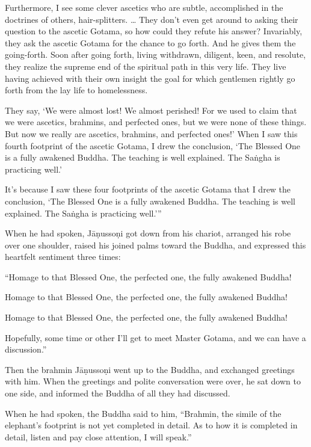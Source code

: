 \documentclass[12pt,openany]{book}%
\begin{document}
Furthermore, I see some clever ascetics who are subtle, accomplished in the doctrines of others, hair-splitters. … They don’t even get around to asking their question to the ascetic Gotama, so how could they refute his answer? Invariably, they ask the ascetic Gotama for the chance to go forth. And he gives them the going-forth. Soon after going forth, living withdrawn, diligent, keen, and resolute, they realize the supreme end of the spiritual path in this very life. They live having achieved with their own insight the goal for which gentlemen rightly go forth from the lay life to homelessness. 

They say, ‘We were almost lost! We almost perished! For we used to claim that we were ascetics, brahmins, and perfected ones, but we were none of these things. But now we really are ascetics, brahmins, and perfected ones!’ When I saw this fourth footprint of the ascetic Gotama, I drew the conclusion, ‘The Blessed One is a fully awakened Buddha. The teaching is well explained. The \textsanskrit{Saṅgha} is practicing well.’ 

It’s because I saw these four footprints of the ascetic Gotama that I drew the conclusion, ‘The Blessed One is a fully awakened Buddha. The teaching is well explained. The \textsanskrit{Saṅgha} is practicing well.’” 

When he had spoken, \textsanskrit{Jāṇussoṇi} got down from his chariot, arranged his robe over one shoulder, raised his joined palms toward the Buddha, and expressed this heartfelt sentiment three times: 

“Homage to that Blessed One, the perfected one, the fully awakened Buddha! 

Homage to that Blessed One, the perfected one, the fully awakened Buddha! 

Homage to that Blessed One, the perfected one, the fully awakened Buddha! 

Hopefully, some time or other I’ll get to meet Master Gotama, and we can have a discussion.” 

Then the brahmin \textsanskrit{Jāṇussoṇi} went up to the Buddha, and exchanged greetings with him. When the greetings and polite conversation were over, he sat down to one side, and informed the Buddha of all they had discussed. 

When he had spoken, the Buddha said to him, “Brahmin, the simile of the elephant’s footprint is not yet completed in detail. As to how it is completed in detail, listen and pay close attention, I will speak.” 
\end{document}
